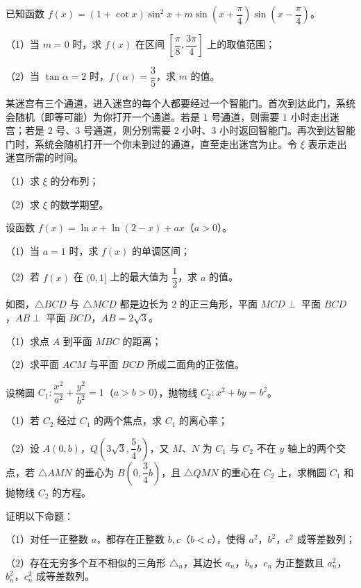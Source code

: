 \begin{question}
已知函数 $f(x)=(1+\cot x)\sin^2x+m\sin\left(x+\dfrac\pi4\right)\sin\left(x-\dfrac\pi4\right)$。

（1）当 $m=0$ 时，求 $f(x)$ 在区间 $\left[\dfrac\pi8,\dfrac{3\pi}4\right]$ 上的取值范围；

（2）当 $\tan\alpha=2$ 时，$f(\alpha)=\dfrac35$，求 $m$ 的值。

\end{question}
\begin{question}
某迷宫有三个通道，进入迷宫的每个人都要经过一个智能门。首次到达此门，系统会随机（即等可能）为你打开一个通道。若是 $1$ 号通道，则需要 $1$ 小时走出迷宫；若是 $2$ 号、$3$ 号通道，则分别需要 $2$ 小时、$3$ 小时返回智能门。再次到达智能门时，系统会随机打开一个你未到过的通道，直至走出迷宫为止。令 $\xi$ 表示走出迷宫所需的时间。

（1）求 $\xi$ 的分布列；

（2）求 $\xi$ 的数学期望。

\end{question}
\begin{question}
设函数 $f(x)=\ln x+\ln(2-x)+ax$（$a>0$）。

（1）当 $a=1$ 时，求 $f(x)$ 的单调区间；

（2）若 $f(x)$ 在 $(0,1]$ 上的最大值为 $\dfrac12$，求 $a$ 的值。

\Needspace{0.4\textheight}
\end{question}
\begingroup
\renewenvironment{question}{\Needspace{0.5\textheight}}{}
\begin{question}
如图，$\triangle BCD$ 与 $\triangle MCD$ 都是边长为 $2$ 的正三角形，平面 $MCD\perp$ 平面 $BCD$，$AB\perp$ 平面 $BCD$，$AB=2\sqrt3$。

（1）求点 $A$ 到平面 $MBC$ 的距离；

（2）求平面 $ACM$ 与平面 $BCD$ 所成二面角的正弦值。
\nopagebreak[4]
\begin{center}\end{center}
\nopagebreak[4]
\Needspace{0.4\textheight}
\end{question}
\endgroup
\begingroup
\renewenvironment{question}{\Needspace{0.5\textheight}}{}
\begin{question}
设椭圆 $C_1:\dfrac{x^2}{a^2}+\dfrac{y^2}{b^2}=1$（$a>b>0$），抛物线 $C_2:x^2+by=b^2$。

（1）若 $C_2$ 经过 $C_1$ 的两个焦点，求 $C_1$ 的离心率；

（2）设 $A(0,b)$，$Q\left(3\sqrt3,\dfrac54b\right)$，又 $M$、$N$ 为 $C_1$ 与 $C_2$ 不在 $y$ 轴上的两个交点，若 $\triangle AMN$ 的垂心为 $B\left(0,\dfrac34b\right)$，且 $\triangle QMN$ 的重心在 $C_2$ 上，求椭圆 $C_1$ 和抛物线 $C_2$ 的方程。
\nopagebreak[4]
\begin{center}\end{center}
\nopagebreak[4]
\end{question}
\endgroup
\begin{question}
证明以下命题：

（1）对任一正整数 $a$，都存在正整数 $b,c$（$b<c$），使得 $a^2$，$b^2$，$c^2$ 成等差数列；

（2）存在无穷多个互不相似的三角形 $\triangle_n$，其边长 $a_n$，$b_n$，$c_n$ 为正整数且 $a_n^2$，$b_n^2$，$c_n^2$ 成等差数列。

\end{question}